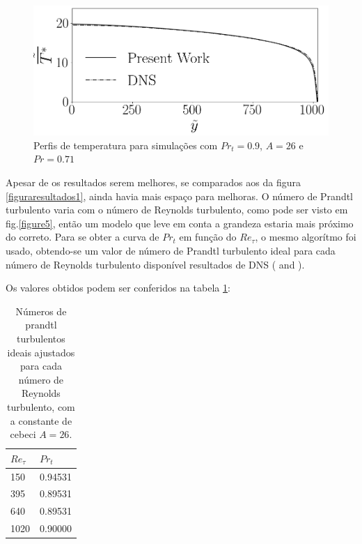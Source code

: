 \begin{figure}[!h]
\begin{minipage}[t]{0.5\textwidth}
	\end{minipage}
	\begin{minipage}[t]{0.45\textwidth}
		\centering
		\includegraphics[angle=0, scale=0.34]{fotos_formatacao_final/Temperature_1000_071_Prt0905_A26}
	\end{minipage}	
	\caption{Perfis de temperatura para simulações com $Pr_t = 0.9 $, $A = 26$ e $Pr =0.71$ }
	\label{primeiros}
\end{figure}

Apesar de os resultados serem melhores, se comparados aos da figura \ref{figuraresultados1}, ainda havia mais espaço para melhoras. O número de Prandtl turbulento varia com o número de Reynolds turbulento, como pode ser visto em fig.\ref{figure5}, então um modelo que leve em conta a grandeza estaria mais próximo do correto. 
Para se obter a curva de $Pr_t$ em função do $Re_\tau$, o mesmo algorítmo foi usado, obtendo-se um valor de número de Prandtl turbulento ideal para cada número de Reynolds turbulento disponível resultados de DNS (\cite{dns1020} and \cite{dns150}).

Os valores obtidos podem ser conferidos na tabela \ref{tabela1}:

\begin{table}[!h]
	\centering
	\caption{Números de prandtl turbulentos ideais ajustados para cada número de Reynolds turbulento, com a constante de cebeci $A = 26$.}
	\begin{tabular}{ll}
		  \hline
		  $Re_\tau$ & $Pr_t$\\
		  \hline
		  150  &   0.94531\\
		  395  &   0.89531\\
		  640  &   0.89531\\
		  1020 &   0.90000\\ 
		  \hline
	\end{tabular}
	\label{tabela1}
\end{table}

